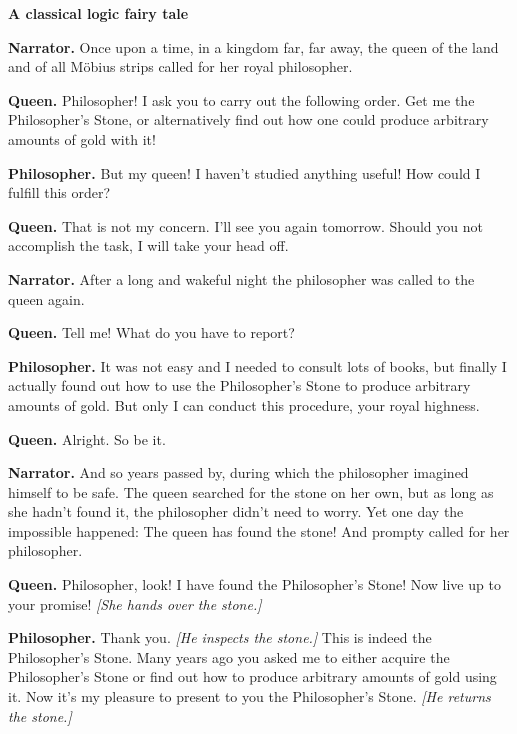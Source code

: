 \documentclass[18pt]{scrartcl}
\begin{document}
\enlargethispage{4em}

\vspace*{-3em}

\begin{center}
\large \textbf{A classical logic fairy tale}
\end{center}

\textbf{Narrator.} Once upon a time, in a kingdom far, far away, the queen of
the land and of all Möbius strips called for her royal philosopher.

\textbf{Queen.}
Philosopher! I ask you to carry out the following order. Get me the
Philosopher's Stone, or alternatively find out how one could produce arbitrary
amounts of gold with it!

\textbf{Philosopher.}
But my queen! I haven't studied anything useful! How could I fulfill this order?

\textbf{Queen.}
That is not my concern. I'll see you again tomorrow. Should you not accomplish
the task, I will take your head off.

\textbf{Narrator.}
After a long and wakeful night the philosopher was called to the queen again.

\textbf{Queen.}
Tell me! What do you have to report?

\textbf{Philosopher.}
It was not easy and I needed to consult lots of books, but finally I actually
found out how to use the Philosopher's Stone to produce arbitrary amounts of
gold. But only I can conduct this procedure, your royal highness.

\textbf{Queen.}
Alright. So be it.

\textbf{Narrator.}
And so years passed by, during which the philosopher imagined himself to be
safe. The queen searched for the stone on her own, but as long as she hadn't
found it, the philosopher didn't need to worry. Yet one day the impossible
happened: The queen has found the stone! And prompty called for her philosopher.

\textbf{Queen.}
Philosopher, look! I have found the Philosopher's Stone! Now live up to your
promise! \emph{[She hands over the stone.]}

\textbf{Philosopher.}
Thank you. \emph{[He inspects the stone.]} This is indeed the Philosopher's
Stone. Many years ago you asked me to either acquire the Philosopher's Stone or
find out how to produce arbitrary amounts of gold using it. Now it's my
pleasure to present to you the Philosopher's Stone. \emph{[He returns the stone.]}
\end{document}
